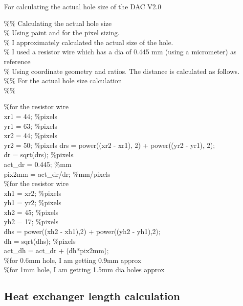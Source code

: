 \begin{appendices}
    For calculating the actual hole size of the DAC V2.0 \bigbreak
    
    {\selectfont
    
    \%\% Calculating the actual hole size \\

    \% Using paint and for the pixel sizing. \\
    \% I approximately calculated the actual size of the hole. \\
    \% I used a resistor wire which has a dia of 0.445 mm (using a micrometer) as reference \\
    \% Using coordinate geometry and ratios. The distance is calculated as follows. \\

    \%\% For the actual hole size calculation \\
    \%\% 

    \%for the resistor wire \\
    xr1 = 44; \%pixels \\
    yr1 = 63; \%pixels \\
    xr2 = 44; \%pixels \\
    yr2 = 50; \%pixels 
    drs = power((xr2 - xr1), 2) + power((yr2 - yr1), 2); \\
    dr = sqrt(drs); \%pixels \\
    act\_dr = 0.445; \%mm \\
    pix2mm = act\_dr/dr; \%mm/pixels \\

    \%for the resistor wire \\
    xh1 = xr2; \%pixels \\
    yh1 = yr2; \%pixels \\
    xh2 = 45; \%pixels \\
    yh2 = 17; \%pixels \\
    dhs = power((xh2 - xh1),2) + power((yh2 - yh1),2); \\
    dh = sqrt(dhs); \%pixels \\
    act\_dh = act\_dr + (dh*pix2mm); \\

    \%for 0.6mm hole, I am getting 0.9mm approx \\
    \%for 1mm hole, I am getting 1.5mm dia holes approx \\
    }
    
\subsection{Heat exchanger length calculation}


\end{appendices}
